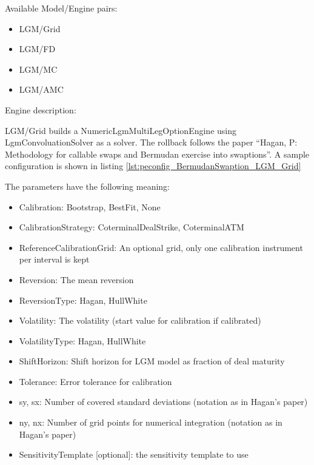 Available Model/Engine pairs:

\begin{itemize}
\item LGM/Grid
\item LGM/FD
\item LGM/MC
\item LGM/AMC
\end{itemize}

Engine description:

LGM/Grid builds a NumericLgmMultiLegOptionEngine using LgmConvoluationSolver as a solver. The rollback follows the paper
``Hagan, P: Methodology for callable swaps and Bermudan exercise into swaptions''. A sample configuration is shown in
listing \ref{lst:peconfig_BermudanSwaption_LGM_Grid}

The parameters have the following meaning:

\begin{itemize}
\item Calibration: Bootstrap, BestFit, None
\item CalibrationStrategy: CoterminalDealStrike, CoterminalATM
\item ReferenceCalibrationGrid: An optional grid, only one calibration instrument per interval is kept
\item Reversion: The mean reversion
\item ReversionType: Hagan, HullWhite
\item Volatility: The volatility (start value for calibration if calibrated)
\item VolatilityType: Hagan, HullWhite
\item ShiftHorizon: Shift horizon for LGM model as fraction of deal maturity
\item Tolerance: Error tolerance for calibration
\item sy, sx: Number of covered standard deviations (notation as in Hagan's paper)
\item ny, nx: Number of grid points for numerical integration (notation as in Hagan's paper)
\item SensitivityTemplate [optional]: the sensitivity template to use 
\end{itemize}

